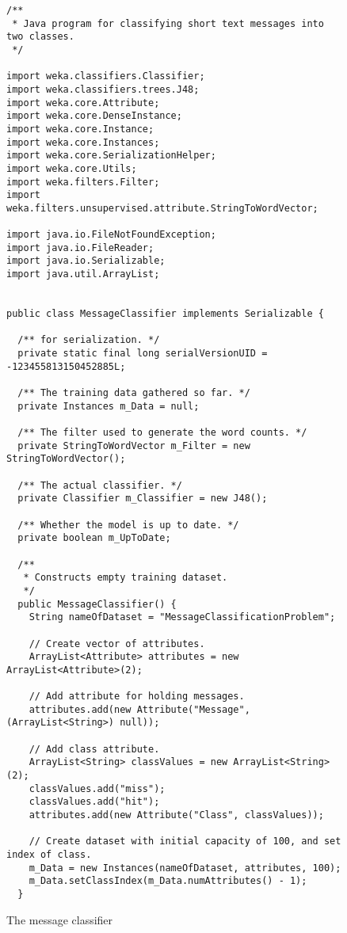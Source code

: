 \begin{figure}[!thp]
\begin{mdframed}[innermargin=-1cm]
\begin{Verbatim}[fontsize=\footnotesize]
/**
 * Java program for classifying short text messages into two classes.
 */

import weka.classifiers.Classifier;
import weka.classifiers.trees.J48;
import weka.core.Attribute;
import weka.core.DenseInstance;
import weka.core.Instance;
import weka.core.Instances;
import weka.core.SerializationHelper;
import weka.core.Utils;
import weka.filters.Filter;
import weka.filters.unsupervised.attribute.StringToWordVector;

import java.io.FileNotFoundException;
import java.io.FileReader;
import java.io.Serializable;
import java.util.ArrayList;


public class MessageClassifier implements Serializable {

  /** for serialization. */
  private static final long serialVersionUID = -123455813150452885L;

  /** The training data gathered so far. */
  private Instances m_Data = null;

  /** The filter used to generate the word counts. */
  private StringToWordVector m_Filter = new StringToWordVector();

  /** The actual classifier. */
  private Classifier m_Classifier = new J48();

  /** Whether the model is up to date. */
  private boolean m_UpToDate;

  /**
   * Constructs empty training dataset.
   */
  public MessageClassifier() {
    String nameOfDataset = "MessageClassificationProblem";

    // Create vector of attributes.
    ArrayList<Attribute> attributes = new ArrayList<Attribute>(2);

    // Add attribute for holding messages.
    attributes.add(new Attribute("Message", (ArrayList<String>) null));

    // Add class attribute.
    ArrayList<String> classValues = new ArrayList<String>(2);
    classValues.add("miss");
    classValues.add("hit");
    attributes.add(new Attribute("Class", classValues));

    // Create dataset with initial capacity of 100, and set index of class.
    m_Data = new Instances(nameOfDataset, attributes, 100);
    m_Data.setClassIndex(m_Data.numAttributes() - 1);
  }
\end{Verbatim}
\end{mdframed}
\caption{\label{fig:message_classifier}The message classifier}
\end{figure}

